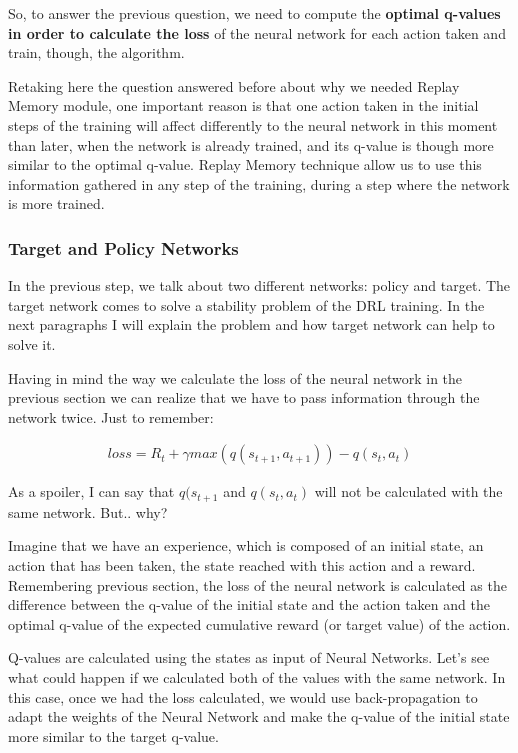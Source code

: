 			So, to answer the previous question, we need to compute the\textbf{ optimal q-values in order to calculate the loss} of the neural network for each action taken and train, though, the algorithm.
			
			Retaking here the question answered before about why we needed Replay Memory module, one important reason is that one action taken in the initial steps of the training will affect differently to the neural network in this moment than later, when the network is already trained, and its q-value is though more similar to the optimal q-value. Replay Memory technique allow us to use this information gathered in any step of the training, during a step where the network is more trained.
			
		
		\subsubsection{Target and Policy Networks}
			In the previous step, we talk about two different networks: policy and target. The target network comes to solve a stability problem of the DRL training. In the next paragraphs I will explain the problem and how target network can help to solve it.
			
			Having in mind the way we calculate the loss of the neural network in the previous section we can realize that we have to pass information through the network twice. Just to remember:
			
			\begin{gather*}
				loss = R_t + \gamma max(q(s_{t+1}, a_{t+1})) - q(s_t, a_t)
			\end{gather*}
		
			As a spoiler, I can say that $q(s_{t+1}$ and $q(s_t, a_t)$ will not be calculated with the same network. But.. why?
			
			Imagine that we have an experience, which is composed of an initial state, an action that has been taken, the state reached with this action and a reward. Remembering previous section, the loss of the neural network is calculated as the difference between the q-value of the initial state and the action taken and the optimal q-value of the expected cumulative reward (or target value) of the action.
			
			Q-values are calculated using the states as input of Neural Networks. Let's see what could happen if we calculated both of the values with the same network. In this case, once we had the loss calculated, we would use back-propagation to adapt the weights of the Neural Network and make the q-value of the initial state more similar to the target q-value.
			
